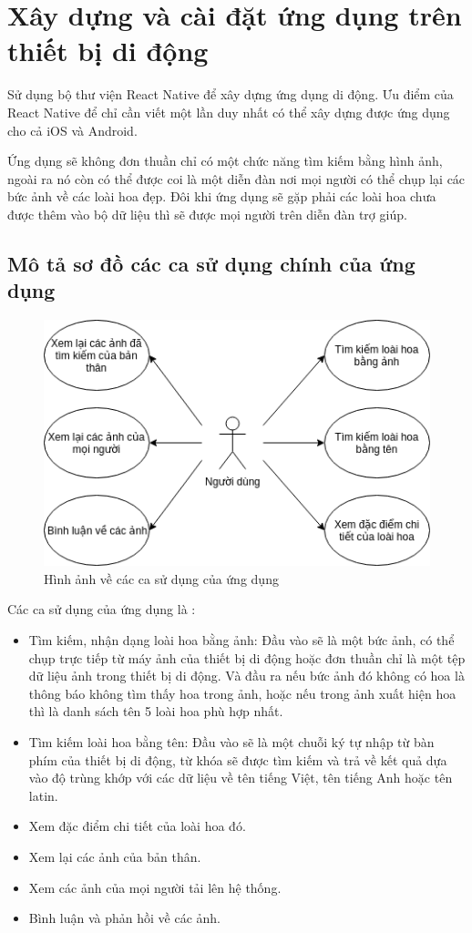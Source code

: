 \documentclass[12pt]{report}
\begin{document}
		

		\section{Xây dựng và cài đặt ứng dụng trên thiết bị di động}
		Sử dụng bộ thư viện React Native để xây dựng ứng dụng di động. Ưu điểm của React Native để chỉ cần viết một lần duy nhất có thể xây dựng được ứng dụng cho cả iOS và Android.
		
		Ứng dụng sẽ không đơn thuần chỉ có một chức năng tìm kiếm bằng hình ảnh, ngoài ra nó còn có thể được coi là một diễn đàn
		nơi mọi người có thể chụp lại các bức ảnh về các loài hoa đẹp. Đôi khi ứng dụng sẽ gặp phải các loài hoa chưa được thêm vào bộ dữ liệu thì sẽ được mọi người trên diễn đàn trợ giúp.

		\subsection{Mô tả sơ đồ các ca sử dụng chính của ứng dụng}
						
		\begin{figure}[h]
			\centering
			\includegraphics[scale=0.8]{usecase}
			\caption{Hình ảnh về các ca sử dụng của ứng dụng}
			\label{fig:usecase}
		\end{figure}
		Các ca sử dụng của ứng dụng là :
				
		\begin{itemize}
			\item Tìm kiếm, nhận dạng loài hoa bằng ảnh: Đầu vào sẽ là một bức ảnh, có thể chụp trực tiếp từ máy ảnh của thiết bị di động
			hoặc đơn thuần chỉ là một tệp dữ liệu ảnh trong thiết bị di động. Và đầu ra nếu bức ảnh đó không có hoa là thông báo không tìm thấy hoa trong ảnh,
			hoặc nếu trong ảnh xuất hiện hoa thì là danh sách tên 5 loài hoa phù hợp nhất.
			\item Tìm kiếm loài hoa bằng tên: Đầu vào sẽ là một chuỗi ký tự nhập từ bàn phím của thiết bị di động, từ khóa sẽ được tìm kiếm và trả về kết quả dựa vào độ trùng khớp với các dữ liệu về tên tiếng Việt, tên tiếng Anh hoặc
			tên latin.
			\item Xem đặc điểm chi tiết của loài hoa đó.
			\item Xem lại các ảnh của bản thân.
			\item Xem các ảnh của mọi người tải lên hệ thống.
			\item Bình luận và phản hồi về các ảnh.
		\end{itemize}
				
\end{document}
